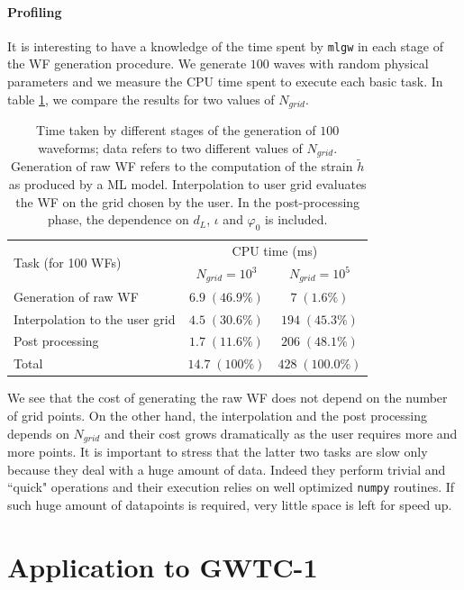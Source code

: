 \paragraph{Profiling}
It is interesting to have a knowledge of the time spent by \texttt{mlgw} in each stage of the WF generation procedure.
We generate $100$ waves with random physical parameters and we measure the CPU time spent to execute each basic task.
In table \ref{tab:profiling}, we compare the results for two values of $N_{grid}$.
\begin{table}
	\def\arraystretch{1.5}
	\begin{tabular}{ l c c }
		\multirow{2}{*}{Task (for 100 WFs)}& \multicolumn{2}{c}{CPU time (ms)}\\
			&$N_{grid} = 10^3$	& $N_{grid} = 10^5$\\
	\hline \hline
		 Generation of raw WF 			& $6.9 \; (46.9\%)$	& $7 \; (1.6\%)$ \\ 
	\hline
		 Interpolation to the user grid & $4.5 \; (30.6\%)$	& $194 \; (45.3\%)$ \\ 
	\hline
		 Post processing 				& $1.7 \; (11.6\%)$	& $206 \; (48.1\%)$ \\
	\hline
		 Total							& $14.7 \; (100\%)$ &  $428 \; (100.0\%)$ \\
	\hline \hline
	\end{tabular}
	\caption{
Time taken by different stages of the generation of $100$ waveforms; data refers to two different values of $N_{grid}$.
Generation of raw WF refers to the computation of the strain $\tilde{h}$ as produced by a ML model. Interpolation to user grid evaluates the WF on the grid chosen by the user. In the post-processing phase, the dependence on $d_L$, $\iota$ and $\varphi_0$ is included.
}
	\label{tab:profiling}
\end{table}
\par
We see that the cost of generating the raw WF does not depend on the number of grid points. On the other hand, the interpolation and the post processing depends on $N_{grid}$ and their cost grows dramatically as the user requires more and more points.
It is important to stress that the latter two tasks are slow only because they deal with a huge amount of data. Indeed they perform trivial and ``quick" operations and their execution relies on well optimized \texttt{numpy} routines.
If such huge amount of datapoints is required, very little space is left for speed up.
\par

\section{Application to GWTC-1}

